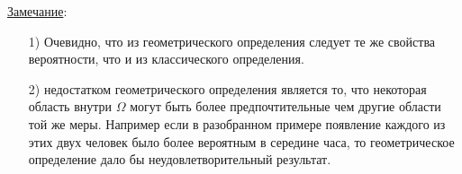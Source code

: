 \underline{Замечание}:
\begin{enumerate}
	\item[1)]
	Очевидно, что из геометрического определения следует те же свойства вероятности, что и из классического определения.
	
	\item[2)]
	недостатком геометрического определения является то, что некоторая область внутри $\Omega$ могут быть более предпочтительные чем другие области той же меры. Например если в разобранном примере появление каждого из этих двух человек было более вероятным в середине часа, то геометрическое определение дало бы неудовлетворительный результат.
\end{enumerate}



























